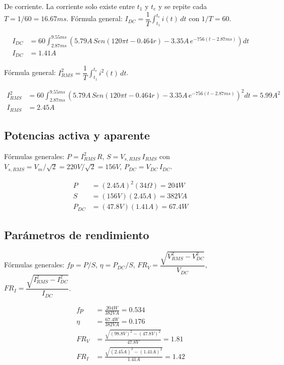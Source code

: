 \documentclass[11pt]{article}
\begin{document}
De corriente. La corriente solo existe entre $t_1$ y $t_e$ y se repite cada
$T = 1/60 = 16.67ms$. F\'ormula general:
$I_{DC} = \dfrac{1}{T}\displaystyle\int_{t_1}^{t_e} i(t)\,dt$ con $1/T = 60$.

\begin{align*}
I_{DC} &= 60\int_{2.87ms}^{9.55ms}\left(5.79A\,Sen(120\pi t - 0.464r) - 3.35A\,e^{-756(t-2.87ms)}\right)dt \\
I_{DC} &= \boxed{1.41A}
\end{align*}

F\'ormula general:
$I_{RMS}^2 = \dfrac{1}{T}\displaystyle\int_{t_1}^{t_e} i^2(t)\,dt$.

\begin{align*}
I_{RMS}^2 &= 60\int_{2.87ms}^{9.55ms}\left(5.79A\,Sen(120\pi t - 0.464r) - 3.35A\,e^{-756(t-2.87ms)}\right)^2 dt = 5.99A^2 \\
I_{RMS} &= \boxed{2.45A}
\end{align*}

\subsection{Potencias activa y aparente}

F\'ormulas generales: $P = I_{RMS}^2\,R$, \quad $S = V_{s,RMS}\,I_{RMS}$ con
$V_{s,RMS} = V_m/\sqrt{2} = 220V/\sqrt{2} = 156V$, \quad $P_{DC} = V_{DC}\,I_{DC}$.

\begin{align*}
P &= (2.45A)^2(34\Omega) = \boxed{204W} \\
S &= (156V)(2.45A) = \boxed{382VA} \\
P_{DC} &= (47.8V)(1.41A) = \boxed{67.4W}
\end{align*}

\subsection{Par\'ametros de rendimiento}

F\'ormulas generales: $fp = P/S$, \quad $\eta = P_{DC}/S$, \quad
$FR_V = \dfrac{\sqrt{V_{RMS}^2 - V_{DC}^2}}{V_{DC}}$, \quad
$FR_I = \dfrac{\sqrt{I_{RMS}^2 - I_{DC}^2}}{I_{DC}}$.

\begin{align*}
fp &= \frac{204W}{382VA} = \boxed{0.534} \\
\eta &= \frac{67.4W}{382VA} = \boxed{0.176} \\
FR_V &= \frac{\sqrt{(98.8V)^2-(47.8V)^2}}{47.8V} = \boxed{1.81} \\
FR_I &= \frac{\sqrt{(2.45A)^2-(1.41A)^2}}{1.41A} = \boxed{1.42}
\end{align*}
\end{document}

